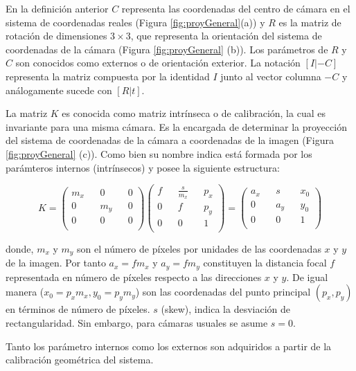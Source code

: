 En la definición anterior $C$ representa las coordenadas del centro de cámara en el sistema de coordenadas reales (Figura \ref{fig:proyGeneral}(a)) y $R$ es la matriz de rotación de dimensiones $3 \times 3$, que representa la orientación del sistema de coordenadas de la cámara (Figura \ref{fig:proyGeneral} (b)). Los parámetros de $R$ y $C$ son conocidos como externos o de orientación exterior. La notación $[I| - C]$ representa la matriz compuesta por la identidad $I$ junto al vector columna $-C$ y análogamente sucede con $[R|t]$.

La matriz $K$ es conocida como matriz intrínseca o de calibración, la cual es invariante para una misma cámara. Es la encargada de determinar la proyección del sistema de coordenadas de la cámara a coordenadas de la imagen (Figura \ref{fig:proyGeneral} (c)). Como bien su nombre indica está formada por los parámteros internos (intrínsecos) y posee la siguiente estructura:

\begin{equation}
	K = \begin{pmatrix}
		m_x && 0 && 0 \\
		0 && m_y && 0 \\
		0 && 0 && 0 \\
	\end{pmatrix}
	\begin{pmatrix}
		f && \frac{s}{m_x} && p_x \\
		0 && f && p_y \\
		0 && 0 && 1 \\
	\end{pmatrix} =
	\begin{pmatrix}
		a_x && s && x_0 \\
		0 && a_y && y_0 \\
		0 && 0 && 1 \\
	\end{pmatrix}
\end{equation}

donde, $m_x$ y $m_y$ son el número de píxeles por unidades de las coordenadas $x$ y $y$ de la imagen. Por tanto $a_x = fm_x$ y $a_y = fm_y$ constituyen la distancia focal $f$ representada en número de píxeles respecto a las direcciones $x$ y $y$. De igual manera ($x_0 = p_xm_x, y_0 = p_ym_y$) son las coordenadas del punto principal $(p_x, p_y)$ en términos de número de píxeles. $s$ (skew), indica la desviación de rectangularidad. Sin embargo, para cámaras usuales se asume $s=0$.

Tanto los parámetro internos como los externos son adquiridos a partir de la calibración geométrica del sistema.

